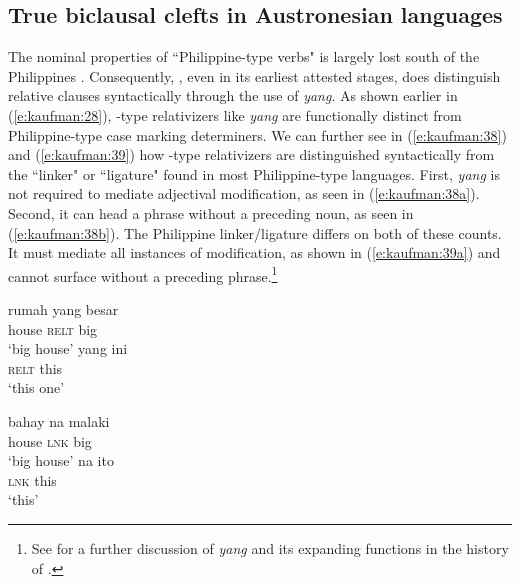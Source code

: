 \documentclass[output=paper]{langsci/langscibook}
\begin{document}
\subsection{\label{s:kaufman:3.2}True biclausal clefts in Austronesian languages}

The nominal properties of ``Philippine-type verbs" is largely lost south of the Philippines \citep{Kaufman:2009typo}. Consequently, , even in its earliest attested stages, does distinguish relative clauses syntactically through the use of \textit{yang}. As shown earlier in (\ref{e:kaufman:28}), -type relativizers like \textit{yang} are functionally distinct from Philippine-type case marking determiners. We can further see in (\ref{e:kaufman:38}) and (\ref{e:kaufman:39}) how -type relativizers are distinguished syntactically from the ``linker" or ``ligature" found in most Philippine-type languages. First, \textit{yang} is not required to mediate adjectival modification, as seen in (\ref{e:kaufman:38a}). Second, it can head a phrase without a preceding noun, as seen in (\ref{e:kaufman:38b}). The Philippine linker/ligature differs on both of these counts. It must mediate all instances of modification, as shown in (\ref{e:kaufman:39a}) and cannot surface without a preceding phrase.\footnote{See \citet{Yap:2011} for a further discussion of \textit{yang} and its expanding functions in the history of .}

  
\begin{exe}
	\ex\label{e:kaufman:38}
	\begin{xlist}
		\ex\label{e:kaufman:38a}
        \gll rumah {\USOParen}yang{\USCParen} besar\\
		house \phantom{(}\textsc{relt} big \\
		\glt `big house'
		\ex\label{e:kaufman:38b}
        \gll {\USOParen}yang{\USCParen} ini\\
		\phantom{(}\textsc{relt} this \\
		\glt `this one'
	\end{xlist}
\end{exe}

\begin{exe}
	\ex\label{e:kaufman:39}
	\begin{xlist}
		\exi{Tagalog}
		\ex\label{e:kaufman:39a}
        \gll bahay {\USStar}{\USOParen}na{\USCParen} malaki\\
		house \phantom{*(}\textsc{lnk} big\\
		\glt `big house'
		\ex\label{e:kaufman:39b}
        \gll {\USOParen}{\USStar}na{\USCParen} ito\\
		\phantom{(*}\textsc{lnk} this\\
		\glt `this'
	\end{xlist}
\end{exe}
\end{document}
